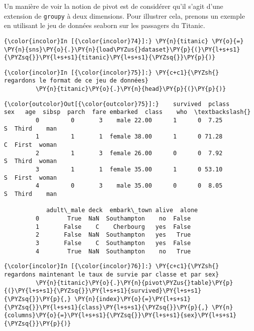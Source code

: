     Un manière de voir la notion de pivot est de considérer qu'il s'agit
d'une extension de \texttt{groupy} à deux dimensions. Pour illustrer
cela, prenons un exemple en utilisant le jeu de données seaborn sur les
passagers du Titanic.

    \begin{Verbatim}[commandchars=\\\{\}]
{\color{incolor}In [{\color{incolor}74}]:} \PY{n}{titanic} \PY{o}{=} \PY{n}{sns}\PY{o}{.}\PY{n}{load\PYZus{}dataset}\PY{p}{(}\PY{l+s+s1}{\PYZsq{}}\PY{l+s+s1}{titanic}\PY{l+s+s1}{\PYZsq{}}\PY{p}{)}
\end{Verbatim}


    \begin{Verbatim}[commandchars=\\\{\}]
{\color{incolor}In [{\color{incolor}75}]:} \PY{c+c1}{\PYZsh{} regardons le format de ce jeu de données}
         \PY{n}{titanic}\PY{o}{.}\PY{n}{head}\PY{p}{(}\PY{p}{)}
\end{Verbatim}


\begin{Verbatim}[commandchars=\\\{\}]
{\color{outcolor}Out[{\color{outcolor}75}]:}    survived  pclass     sex   age  sibsp  parch  fare embarked  class    who  \textbackslash{}
         0         0       3    male 22.00      1      0  7.25        S  Third    man   
         1         1       1  female 38.00      1      0 71.28        C  First  woman   
         2         1       3  female 26.00      0      0  7.92        S  Third  woman   
         3         1       1  female 35.00      1      0 53.10        S  First  woman   
         4         0       3    male 35.00      0      0  8.05        S  Third    man   
         
            adult\_male deck  embark\_town alive  alone  
         0        True  NaN  Southampton    no  False  
         1       False    C    Cherbourg   yes  False  
         2       False  NaN  Southampton   yes   True  
         3       False    C  Southampton   yes  False  
         4        True  NaN  Southampton    no   True  
\end{Verbatim}
            
    \begin{Verbatim}[commandchars=\\\{\}]
{\color{incolor}In [{\color{incolor}76}]:} \PY{c+c1}{\PYZsh{} regardons maintenant le taux de survie par classe et par sex}
         \PY{n}{titanic}\PY{o}{.}\PY{n}{pivot\PYZus{}table}\PY{p}{(}\PY{l+s+s1}{\PYZsq{}}\PY{l+s+s1}{survived}\PY{l+s+s1}{\PYZsq{}}\PY{p}{,} \PY{n}{index}\PY{o}{=}\PY{l+s+s1}{\PYZsq{}}\PY{l+s+s1}{class}\PY{l+s+s1}{\PYZsq{}}\PY{p}{,} \PY{n}{columns}\PY{o}{=}\PY{l+s+s1}{\PYZsq{}}\PY{l+s+s1}{sex}\PY{l+s+s1}{\PYZsq{}}\PY{p}{)}
\end{Verbatim}


